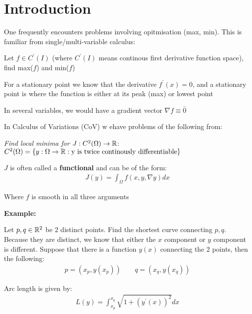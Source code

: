 \section{Introduction}
\par\bigskip
\noindent One frequently encounters problems involving opitmisation (max, min). This is familiar from single/multi-variable calculus:
\par\bigskip
Let $f\in C^{\prime}(I)$ (where $C^{\prime}(I)$ means continous first derivative function space), find max($f$) and min($f$)
\par\bigskip
\noindent For a stationary point we know that the derivative $f^{\prime}(x) = 0$, and a stationary point is where the function is either at its peak (max) or lowest point
\par\bigskip
\noindent In several variables, we would have a gradient vector $\nabla f \equiv \bar{0}$
\par\bigskip
\noindent In Calculus of Variations (CoV) w ehave problems of the following from:
\par\bigskip
\textit{Find local minima for $J:C^2(\Omega)\to\mathbb{R}$}: $C^2(\Omega) = \{y:\Omega\to\mathbb{R}:\text{y is twice continously differentiable}\}$
\par\bigskip
\noindent $J$  is often called a \textbf{functional} and can be of the form:
\begin{equation*}
  \begin{gathered}
    J(y) = \int_{\Omega}f(x,y,\nabla y)dx
  \end{gathered}
\end{equation*}\par
\noindent Where $f$ is smooth in all three arguments
\par\bigskip
\noindent\textbf{Example:}
\par\bigskip
\noindent Let $p,q\in\mathbb{R}^2$ be 2 distinct points. Find the shortest curve connecting $p,q$. Because they are distinct, we know that either the $x$ component or $y$ component is different. Suppose that there is a function $y(x)$ connecting the 2 points, then the following:
\begin{equation*}
  \begin{gathered}
    p = (x_p,y(x_p))\qquad q = (x_q,y(x_q))
  \end{gathered}
\end{equation*}
\par\bigskip
\noindent Arc length is given by:
\begin{equation*}
  \begin{gathered}
    L(y) = \int_{x_p}^{x_q}\sqrt{1+(y^{\prime}(x))^2}dx
  \end{gathered}
\end{equation*}
